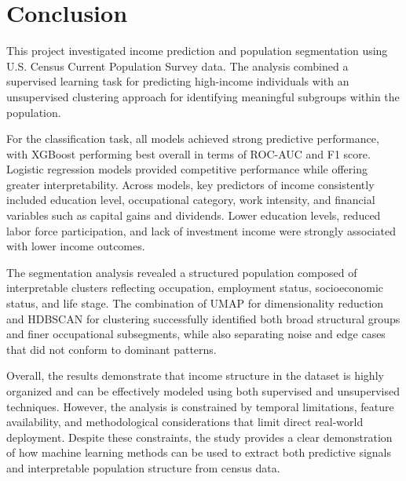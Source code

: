 
\section{Conclusion}

This project investigated income prediction and population segmentation using U.S. Census Current Population Survey data. The analysis combined a supervised learning task for predicting high-income individuals with an unsupervised clustering approach for identifying meaningful subgroups within the population.

For the classification task, all models achieved strong predictive performance, with XGBoost performing best overall in terms of ROC-AUC and F1 score. Logistic regression models provided competitive performance while offering greater interpretability. Across models, key predictors of income consistently included education level, occupational category, work intensity, and financial variables such as capital gains and dividends. Lower education levels, reduced labor force participation, and lack of investment income were strongly associated with lower income outcomes.

The segmentation analysis revealed a structured population composed of interpretable clusters reflecting occupation, employment status, socioeconomic status, and life stage. The combination of UMAP for dimensionality reduction and HDBSCAN for clustering successfully identified both broad structural groups and finer occupational subsegments, while also separating noise and edge cases that did not conform to dominant patterns.

Overall, the results demonstrate that income structure in the dataset is highly organized and can be effectively modeled using both supervised and unsupervised techniques. However, the analysis is constrained by temporal limitations, feature availability, and methodological considerations that limit direct real-world deployment. Despite these constraints, the study provides a clear demonstration of how machine learning methods can be used to extract both predictive signals and interpretable population structure from census data.